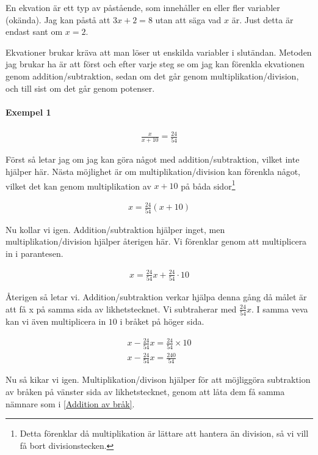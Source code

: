 En ekvation är ett typ av påstående, som innehåller en eller fler variabler (okända). Jag kan påstå att $3x+2 = 8$ utan att säga vad $x$ är. Just detta är endast sant om $x=2$.

Ekvationer brukar kräva att man löser ut enskilda variabler i slutändan. Metoden jag brukar ha är att först och efter varje steg se om jag kan förenkla ekvationen genom addition/subtraktion, sedan om det går genom multiplikation/division, och till sist om det går genom potenser.

\paragraph{Exempel 1}

\begin{align}
	\frac{x}{x+10} = \frac{24}{54}
\end{align}

Först så letar jag om jag kan göra något med addition/subtraktion, vilket inte hjälper här. Nästa möjlighet är om multiplikation/division kan förenkla något, vilket det kan genom multiplikation av $x+10$ på båda sidor\footnote{Detta förenklar då multiplikation är lättare att hantera än division, så vi vill få bort divisionstecken.}

\begin{align}
	x = \frac{24}{54}(x+10)
\end{align}

Nu kollar vi igen. Addition/subtraktion hjälper inget, men multiplikation/division hjälper återigen här. Vi förenklar genom att multiplicera in i parantesen.

\begin{align}
	x = \frac{24}{54}x + \frac{24}{54} \cdot 10
\end{align}

Återigen så letar vi. Addition/subtraktion verkar hjälpa denna gång då målet är att få x på samma sida av likhetstecknet. Vi subtraherar med $\frac{24}{54}x$. I samma veva kan vi även multiplicera in $10$ i bråket på höger sida.

\begin{align}
	x - \frac{24}{54}x = \frac{24}{54} \times 10 \\
	x - \frac{24}{54}x = \frac{240}{54}
\end{align}

Nu så kikar vi igen. Multiplikation/divison hjälper för att möjliggöra subtraktion av bråken på vänster sida av likhetstecknet, genom att låta dem få samma nämnare som i \ref{Addition av bråk}.

